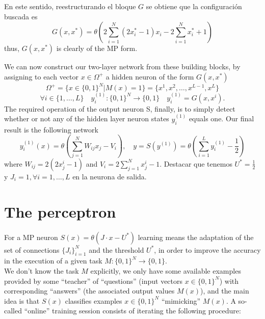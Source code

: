 \noindent
En este sentido, reestructurando el bloque $G$ se obtiene que la configuración buscada es
\begin{equation*}
    G(x, x^* ) = \theta \left( 2\sum_{i=1}^{N} (2x_i^* - 1)x_i - 2\sum_{i=1}^{N}x_i^* + 1 \right) 
\end{equation*}
thus, $G(x, x^*)$ is clearly of the MP form.

\noindent
We can now construct our two-layer network from these building blocks, by assigning to each vector $x \in \Omega^+$ a hidden neuron of the form $G(x, x^*)$
\begin{equation*}
    \Omega^+ = \{x \in \{0, 1\}^N |M (x) = 1\} = \{x^1 , x^2, \ldots, x^{L-1} , x^L\}
\end{equation*}
\begin{equation*}
    \forall i \in \{1, \ldots, L\} \quad y_i^{(1)} : \{0, 1\}^N \rightarrow \{0, 1\} \quad y_i^{(1)} = G(x, x^i ).
\end{equation*}
The required operation of the output neuron S, finally, is to simply detect whether or not any
of the hidden layer neuron states $y_i^{(1)}$ equals one. Our final result is the following network
\begin{equation*}
    y_i^{(1)} (x) = \theta \left( \sum_{ j=1}^{N} W_{ij} x_j - V_i \right), \quad y = S(y^{(1)})=\theta \left( \sum_{i=1}^{L} y_i^{(1)} - \frac{1}{2} \right)
\end{equation*}
where $W_{ij} = 2(2x_j^i - 1)$ and $V_i = 2 \sum\limits_{j=1}^{N} x_j^i - 1$. Destacar que tenemos $U^*= \frac{1}{2}$ y $J_i=1, \forall i=1, \dots, L$ en la neurona de salida.
    
\section{The perceptron}

\noindent
For a MP neuron $S(x) = \theta(J \cdot x - U^*)$ learning means the adaptation of the set of connections $\{J_i\}_{i=1}^{N}$ and the threshold $U^*$, in order to improve the accuracy in the execution of a given task $M : \{0,1\}^N \rightarrow \{0,1\}$.
\\


\noindent
We don't know the task $M$ explicitly, we only have some available examples provided by some ``teacher'' of ``questions'' (input vectors $x \in \{0,1\}^N$) with corresponding ``answers'' (the associated output values $M(x)$), and the main idea is that $S(x)$ classifies examples $x\in\{0,1\}^N$ ``mimicking'' $M(x)$. A so-called ``online'' training session consists of iterating the following procedure:

